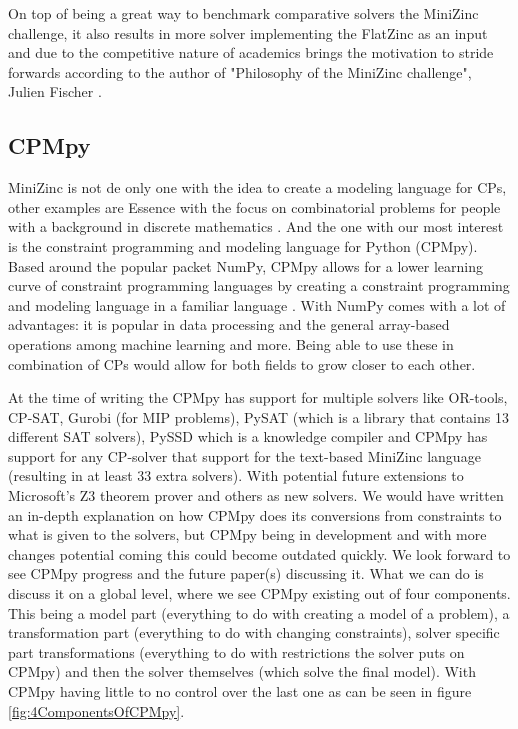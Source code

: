 On top of being a great way to benchmark comparative solvers the MiniZinc challenge, it also results in more solver implementing the FlatZinc as an input and due to the competitive nature of academics brings the motivation to stride forwards according to the author of "Philosophy of the MiniZinc challenge", Julien Fischer \cite{59stuckey2010philosophy}.

\subsection{CPMpy}
\label{CP:CPMpy}
MiniZinc is not de only one with the idea to create a modeling language for CPs, other examples are Essence with the focus on combinatorial problems for people with a background in discrete mathematics \cite{70frisch2008essence}.
And the one with our most interest is the constraint programming and modeling language for Python (CPMpy). Based around the popular packet NumPy, CPMpy allows for a lower learning curve of constraint programming languages by creating a constraint programming and modeling language in a familiar language \cite{17guns2019increasing}. 
With NumPy comes with a lot of advantages: it is popular in data processing and the general array-based operations among machine learning and more. 
Being able to use these in combination of CPs would allow for both fields to grow closer to each other. 


At the time of writing the CPMpy has support for multiple solvers like OR-tools, CP-SAT, Gurobi (for MIP problems), PySAT (which is a library that contains 13 different SAT solvers), PySSD which is a knowledge compiler and CPMpy has support for any CP-solver that support for the text-based MiniZinc language \cite{CPMpyDoc, CPMpyGithub} (resulting in at least 33 extra solvers). With potential future extensions to Microsoft's Z3 theorem prover and others as new solvers.
We would have written an in-depth explanation on how CPMpy does its conversions from constraints to what is given to the solvers, but CPMpy being in development and with more changes potential coming this could become outdated quickly. We look forward to see CPMpy progress and the future paper(s) discussing it. What we can do is discuss it on a global level, where we see CPMpy existing out of four components. This being a model part (everything to do with creating a model of a problem), a transformation part (everything to do with changing constraints), solver specific part transformations (everything to do with restrictions the solver puts on CPMpy) and then the solver themselves (which solve the final model). With CPMpy having little to no control over the last one as can be seen in figure \ref{fig:4ComponentsOfCPMpy}.


